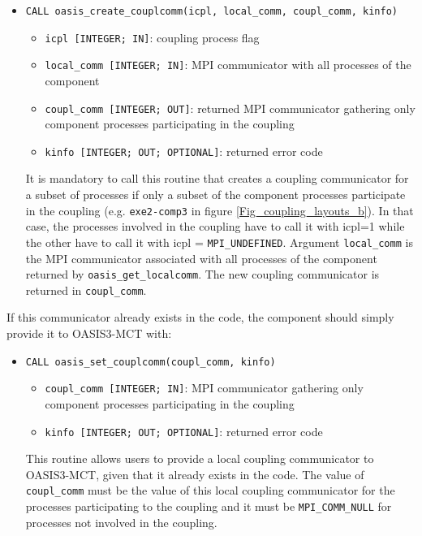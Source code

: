 \begin{itemize}
\item {\tt CALL oasis\_create\_couplcomm(icpl, local\_comm,
    coupl\_comm, kinfo)}
  \begin{itemize}
  \item {\tt icpl [INTEGER; IN]}: coupling process flag
  \item {\tt local\_comm [INTEGER; IN]}: MPI communicator with all
    processes of the component
  \item {\tt coupl\_comm [INTEGER; OUT]}: returned MPI communicator
    gathering only component processes participating in the coupling
  \item {\tt kinfo [INTEGER; OUT; OPTIONAL]}: returned error code
  \end{itemize}

  It is mandatory to call this routine that creates a coupling communicator for a subset of
  processes if only a subset of
  the component processes participate in the coupling (e.g. {\tt exe2-comp3} in figure
    \ref{Fig_coupling_layouts_b}). In that case, the processes
    involved in the coupling have to call it with icpl=1 while the
    other have to call it with icpl = {\tt MPI\_UNDEFINED}. Argument
   {\tt  local\_comm} is the MPI communicator associated with all processes
    of the component returned by {\tt oasis\_get\_localcomm}. The new coupling
    communicator is returned in {\tt coupl\_comm}.

\end{itemize}
If this communicator already exists in the code, the component should
simply provide it to OASIS3-MCT with:

\begin{itemize}
\item {\tt CALL oasis\_set\_couplcomm(coupl\_comm, kinfo)}
  \begin{itemize}
  \item {\tt coupl\_comm [INTEGER; IN]}: MPI communicator gathering
    only component processes participating in the coupling
  \item {\tt kinfo [INTEGER; OUT; OPTIONAL]}: returned error code
  \end{itemize}

  This routine allows users to provide a local coupling communicator to
  OASIS3-MCT, given that it already exists in the code. The value of
  {\tt coupl\_comm} must be the value of this local coupling
  communicator for the processes participating to the coupling and it
  must be {\tt MPI\_COMM\_NULL} for processes not involved in the
  coupling.
\end{itemize}

